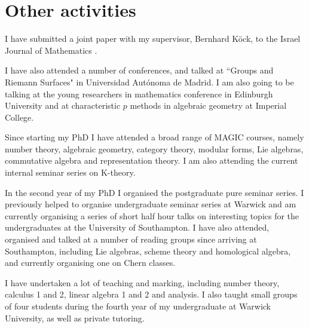\documentclass[draft, 11pt, notitlepage]{article} %
\theoremstyle{plain}
\theoremstyle{remark}
\begin{document}
\section{Other activities}

I have submitted a joint paper with my supervisor, Bernhard K\"{o}ck, to the Israel Journal of Mathematics \cite{faithfulaction}.

I have also attended a number of conferences, and talked at ``Groups and Riemann Surfaces" in Universidad Aut\'{o}noma de Madrid. I am also going to be talking at the young researchers in mathematics conference in Edinburgh University and at characteristic $p$ methods in algebraic geometry at Imperial College.

Since starting my PhD I have attended a broad range of MAGIC courses, namely number theory, algebraic geometry, category theory, modular forms, Lie algebras, commutative algebra and representation theory. I am also attending the current internal seminar series on K-theory.

In the second year of my PhD I organised the postgraduate pure seminar series. I previously helped to organise undergraduate seminar series at Warwick and am currently organising a series of short half hour talks on interesting topics for the undergraduates at the University of Southampton. I have also attended, organised and talked at a number of reading groups since arriving at Southampton, including Lie algebras, scheme theory and homological algebra, and currently organising one on Chern classes. 

I have undertaken a lot of teaching and marking, including number theory, calculus 1 and 2, linear algebra 1 and 2 and analysis. I also taught small groups of four students during the fourth year of my undergraduate at Warwick University, as well as private tutoring.









%


\end{document}
